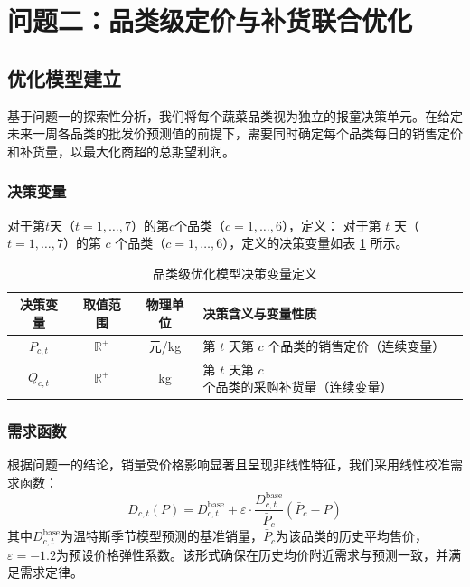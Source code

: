 \documentclass[withoutpreface]{cumcmthesis}
\begin{document}
\section{问题二：品类级定价与补货联合优化}

\subsection{优化模型建立}

基于问题一的探索性分析，我们将每个蔬菜品类视为独立的报童决策单元。在给定未来一周各品类的批发价预测值的前提下，需要同时确定每个品类每日的销售定价和补货量，以最大化商超的总期望利润。

\subsubsection{决策变量}

对于第$t$天（$t=1,\dots,7$）的第$c$个品类（$c=1,\dots,6$），定义：
对于第 $t$ 天（$t=1,\dots,7$）的第 $c$ 个品类（$c=1,\dots,6$），定义的决策变量如表 \ref{tab:p2_vars} 所示。

\begin{table}[htbp]
\centering
\caption{品类级优化模型决策变量定义}
\label{tab:p2_vars}
\begin{tabular}{c c c l}
\toprule
\textbf{决策变量} & \textbf{取值范围} & \textbf{物理单位} & \textbf{决策含义与变量性质} \\
\midrule
$P_{c,t}$ & $\mathbb{R}^+$ & 元/kg & 第 $t$ 天第 $c$ 个品类的销售定价（连续变量） \\
$Q_{c,t}$ & $\mathbb{R}^+$ & kg & 第 $t$ 天第 $c$ 个品类的采购补货量（连续变量） \\
\bottomrule
\end{tabular}
\end{table}

\subsubsection{需求函数}

根据问题一的结论，销量受价格影响显著且呈现非线性特征，我们采用线性校准需求函数：
\begin{equation}
D_{c,t}(P) = D_{c,t}^{\text{base}} + \varepsilon \cdot \frac{D_{c,t}^{\text{base}}}{\bar{P}_c} (\bar{P}_c - P)
\end{equation}
其中$D_{c,t}^{\text{base}}$为温特斯季节模型预测的基准销量，$\bar{P}_c$为该品类的历史平均售价，$\varepsilon=-1.2$为预设价格弹性系数。该形式确保在历史均价附近需求与预测一致，并满足需求定律。
\end{document}
